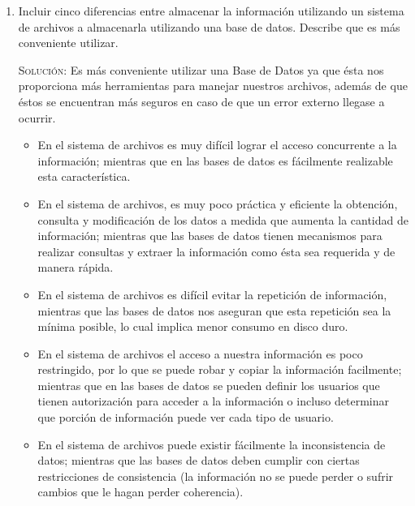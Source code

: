 \documentclass[letterpaper,12pt]{article}
\begin{document}
\begin{enumerate}
    \item Incluir cinco diferencias entre almacenar la información 
    utilizando un sistema de archivos a almacenarla utilizando una base de 
    datos. Describe que es más conveniente utilizar.

    \textsc{Solución:} Es más conveniente utilizar una Base de Datos ya que
    ésta nos proporciona más herramientas para manejar nuestros archivos, 
    además de que éstos se encuentran más seguros en caso de que un error 
    externo llegase a ocurrir. 

    
    \begin{itemize}
        \item En el sistema de archivos es muy difícil lograr el acceso 
        concurrente a la información; mientras que en las bases de datos 
        es fácilmente realizable esta característica.

        \item En el sistema de archivos, es muy poco práctica y eficiente 
        la obtención, consulta y modificación de los datos a medida que 
        aumenta la cantidad de información; mientras que las bases de datos 
        tienen mecanismos para realizar consultas y extraer la información 
        como ésta sea requerida y de manera rápida.

        \item En el sistema de archivos es difícil evitar la repetición de 
        información, mientras que las bases de datos nos aseguran que esta 
        repetición sea la mínima posible, lo cual implica menor consumo en 
        disco duro.

        \item En el sistema de archivos el acceso a nuestra información es 
        poco restringido, por lo que se puede robar y copiar la información
        facilmente; mientras que en las bases de datos se pueden definir los 
        usuarios que tienen autorización para acceder a la información o 
        incluso determinar que porción de información puede ver cada tipo de 
        usuario.

        \item En el sistema de archivos puede existir fácilmente la 
        inconsistencia de datos; mientras que las bases de datos deben 
        cumplir con ciertas restricciones de consistencia (la información 
        no se puede perder o sufrir cambios que le hagan perder coherencia).
    \end{itemize}
    
\end{enumerate}
\end{document}
